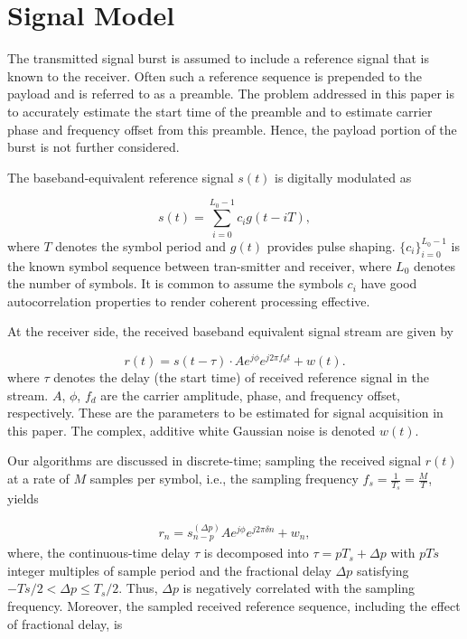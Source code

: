 \section{Signal Model}
\label{sec:model}

The transmitted signal burst is assumed to include a refere\-nce signal that is known to the receiver.
Often such a reference sequence is prepended to the payload and is referred to as a preamble.
The problem addressed in this paper is to accurately estimate the start time of the preamble and 
to estimate carrier phase and frequency offset from this preamble.
Hence, the payload portion of the burst is not further considered.

The baseband-equivalent reference signal $s(t)$ is digitally modulated as

\begin{equation}
    \label{eq:l_ref_sig_analog}
    s(t) = \sum_{i=0}^{L_0-1} c_i g(t-iT),
  \end{equation}
where $T$ denotes the symbol period and $g(t)$ provides pulse shaping. $\{c_i\}_{i=0}^{L_{0}-1}$ is the known symbol sequence
between tran-smitter and receiver, where $L_0$ denotes the number of symbols. It is common to assume the symbols 
$c_i$ have good autocorrelation properties to render coherent processing effective.

At the receiver side, the received baseband equivalent signal stream are given by

\begin{equation}
    \label{eq:rec_sig_analog}
    r(t) = s(t-\tau) \cdot Ae^{j \phi} e^{j2\pi f_d t} + w(t).
  \end{equation}
where $\tau$ denotes the delay (the start time) of received reference signal in the stream. $A$, $\phi$, $f_d$ 
are the carrier amplitude, phase, and frequency offset, respectively. These are the parameters to be estimated
for signal acquisition in this paper. The complex, additive white Gaussian noise is denoted $w(t)$.

Our algorithms are discussed in discrete-time; sampling the received signal $r(t)$ at a rate of $M$ samples per symbol,
i.e., the sampling frequency $f_s=\frac{1}{T_s}=\frac{M}{T}$, yields 

\begin{equation}
    \begin{aligned}
      \label{eq:model}
      r_n = s_{n-p}^{(\Delta p)}Ae^{j\phi}e^{j2\pi\delta n}+w_{n},
    \end{aligned}
  \end{equation}
where, the continuous-time delay $\tau$ is decomposed into $\tau=pT_s+\Delta p$ with $pTs$ integer multiples of sample period and 
the fractional delay $\Delta p$ satisfying $-Ts/2 {<} \Delta p {\leq} T_s/2$. Thus, $\Delta p$ is negatively correlated with
the sampling frequency. Moreover, the sampled received reference sequence, including the effect of fractional delay, is

